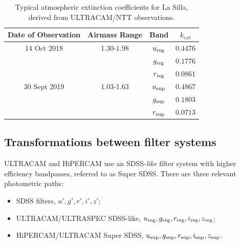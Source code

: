 \begin{table}
    \centering
    \caption{Typical atmospheric extinction coefficients for La Silla, derived from ULTRACAM/NTT observations.}
    \label{table:atmos_extinction}
    \begin{tabular}{cccc}
        \hline
        Date of Observation & Airmass Range & Band & $k_{ext}$ \\
        \hline
        \hline
        14 Oct 2018   & 1.30-1.98 & $u_{\rm reg}$ & $0.4476$ \\
                      &           & $g_{\rm reg}$ & $0.1776$ \\
                      &           & $r_{\rm reg}$ & $0.0861$ \\
        \hline
        30 Sept 2019  & 1.03-1.63 & $u_{\rm sup}$ & $0.4867$ \\
                      &           & $g_{\rm sup}$ & $0.1803$ \\
                      &           & $r_{\rm sup}$ & $0.0713$ \\
        \hline
    \end{tabular}
\end{table}


\subsection{Transformations between filter systems}
\label{sect:observations:colour correction method}

ULTRACAM and HiPERCAM use an SDSS-\emph{like} filter system with higher efficiency bandpasses, referred to as Super SDSS. There are three relevant photometric paths:
\begin{itemize}
\item SDSS filters, $u', g', r', i', z'$;
\item ULTRACAM/ULTRASPEC SDSS-like, $u_{\rm reg}, g_{\rm reg}, r_{\rm reg}, i_{\rm reg}, z_{\rm reg}$;
\item HiPERCAM/ULTRACAM Super SDSS, $u_{\rm sup}, g_{\rm sup}, r_{\rm sup}, i_{\rm sup}, z_{\rm sup}$.
\end{itemize}

